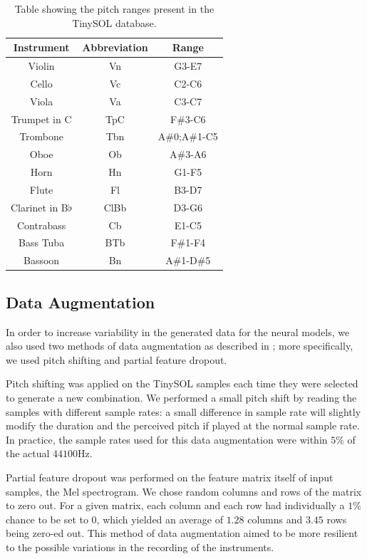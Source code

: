\documentclass[runningheads,a4paper]{llncs}
\begin{document}
\begin{table}
\begin{center}
	\caption{Table showing the pitch ranges present in the TinySOL database.\label{tab:ranges}}
	\begin{tabular}{|c|c|c|}
	\hline
	\textbf{Instrument} & \textbf{Abbreviation} & \textbf{Range} \\
	\hline
	Violin & Vn & G3-E7\\
	Cello & Vc & C2-C6\\
	Viola & Va & C3-C7\\
	Trumpet in C & TpC & F\#3-C6\\
	Trombone & Tbn & A\#0;A\#1-C5\\
	Oboe & Ob & A\#3-A6\\
	Horn & Hn & G1-F5\\
	Flute & Fl & B3-D7\\
	Clarinet in B$\flat$ & ClBb & D3-G6\\
	Contrabass & Cb & E1-C5\\
	Bass Tuba & BTb & F\#1-F4\\
	Bassoon & Bn & A\#1-D\#5\\
	\hline
	\end{tabular}
\end{center}
\end{table}

\subsection{Data Augmentation}

In order to increase variability in the generated data for the neural models, we also used two methods of data augmentation as described in \cite{Salamon17, Bhardwaj17}; more specifically, we used pitch shifting and partial feature dropout.

Pitch shifting was applied on the TinySOL samples each time they were selected to generate a new combination. We performed a small pitch shift by reading the samples with different sample rates: a small difference in sample rate will slightly modify the duration and the perceived pitch if played at the normal sample rate. In practice, the sample rates used for this data augmentation were within $5\%$ of the actual $44100$Hz.

Partial feature dropout was performed on the feature matrix itself of input samples, the Mel spectrogram. We chose random columns and rows of the matrix to zero out. For a given matrix, each column and each row had individually a $1\%$ chance to be set to 0, which yielded an average of $1.28$  columns and $3.45$ rows being zero-ed out. This method of data augmentation aimed to be more resilient to the possible variations in the recording of the instruments.
\end{document}
